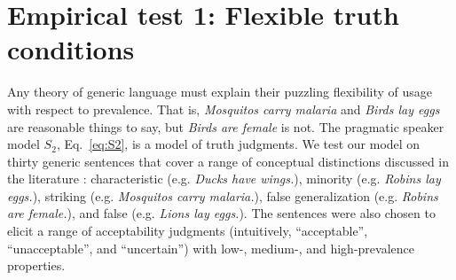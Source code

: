 \documentclass[12pt,letterpaper]{article}
\newcommand{\denote}[1]{\mbox{ $[\![ #1 ]\!]$}}
\begin{document}
%
%
%
%
%




%

\section*{Empirical test 1: Flexible truth conditions}

Any theory of generic language must explain their puzzling flexibility of usage with respect to prevalence.
That is, \emph{Mosquitos carry malaria} and \emph{Birds lay eggs} are reasonable things to say, but \emph{Birds are female} is not.
The pragmatic speaker model $S_2$, Eq.~\ref{eq:S2}, is a model of truth judgments. 
We test our model on thirty generic sentences 
that cover a range of conceptual distinctions discussed in the literature  \cite{Prasada2013}: characteristic (e.g. \emph{Ducks have wings.}), minority (e.g. \emph{Robins lay eggs.}), striking (e.g. \emph{Mosquitos carry malaria.}), false generalization (e.g. \emph{Robins are female.}), and false (e.g. \emph{Lions lay eggs.}).
The sentences were also chosen to elicit a range of acceptability judgments (intuitively, ``acceptable'', ``unacceptable'', and ``uncertain'') with low-, medium-, and high-prevalence properties.
\end{document}
